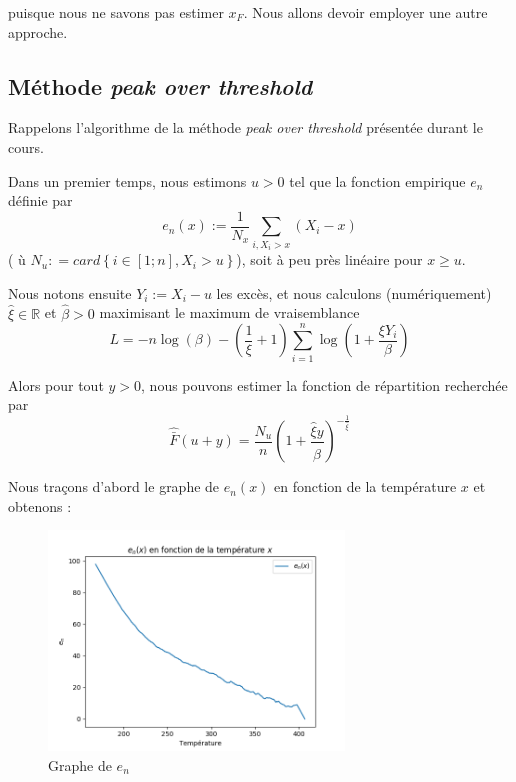 \documentclass[../report.tex]{subfiles}
\begin{document}
puisque nous ne savons pas estimer $x_F$. Nous allons devoir employer une autre approche.


\subsection{Méthode \emph{peak over threshold}}
\par Rappelons l'algorithme de la méthode \emph{peak over threshold} présentée durant le cours. 
\par Dans un premier temps, nous estimons $u > 0$ tel que la fonction empirique $e_n$ définie par 
\begin{displaymath}
e_n \left( x \right) := \frac{1}{N_x} \sum\limits_{i, X_i > x} \left( X_i - x \right)
\end{displaymath}
( ù $N_u : = card \left\lbrace i \in \left[ 1; n \right], X_i > u \right\rbrace$), soit à peu près linéaire pour $x \geq u$.
\par Nous notons ensuite $Y_i := X_i - u$ les excès, et nous calculons (numériquement) $\hat{\xi} \in \mathbb{R}$ et $\hat{\beta} > 0$ maximisant le maximum de vraisemblance 
\begin{displaymath}
L = - n \log \left( \beta \right) - \left( \frac{1}{\xi} + 1 \right) \sum\limits_{i = 1}^n \log \left( 1 + \frac{\xi Y_i}{\beta} \right)
\end{displaymath}
\par Alors pour tout $y > 0$, nous pouvons estimer la fonction de répartition recherchée par 
\begin{displaymath}
\hat{\bar{F}} \left( u + y \right) = \frac{N_u}{n} {\left( 1 + \frac{\hat{\xi} y}{\hat{\beta}} \right)}^{-\frac{1}{\hat{\xi}}}
\end{displaymath}

\par Nous traçons d'abord le graphe de $e_n \left( x \right)$ en fonction de la température $x$ et obtenons :
\begin{figure}[H]
  \centering
    \includegraphics[width=0.7\textwidth]{images/part_2/e_n.png}
  \caption{Graphe de $e_n$}
\end{figure}
\end{document}
